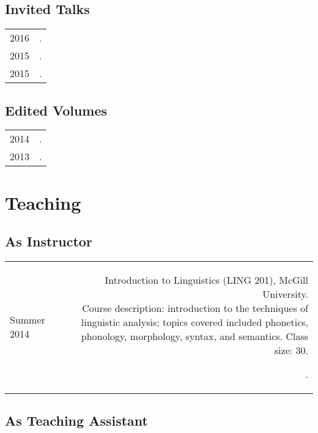 \documentclass[11pt,letterpaper,twoside]{article}
\makeatletter
\newcommand{\bodywidth}{0.75}
\newenvironment{cvsection}{%
  \renewcommand{\arraystretch}{1.75}
  \begin{longtable}[l]{@{} L R @{}}
}{%
  \end{longtable}
}
\newcommand{\course}[3]{%
  \parbox[t]{\bodywidth\textwidth}{#1.\\ {\footnotesize Course description: #2.
      Class size: #3.}}
}
\makeatother
\begin{document}
\subsection*{Invited Talks}

\begin{cvsection}
  2016 & .\\
  2015 & .\\
  2015 & .\\
\end{cvsection}

\subsection*{Edited Volumes}

\begin{cvsection}
  2014 & .\\
  2013 & .
\end{cvsection}

\section*{Teaching}

\subsection*{As Instructor}

\begin{cvsection}
  {\small Summer} 2014 & \course{Introduction to Linguistics (LING 201), McGill
    University}{introduction to the techniques of linguistic analysis; topics
    covered included phonetics, phonology, morphology, syntax, and
    semantics}{30}.
\end{cvsection}

\subsection*{As Teaching Assistant}
\end{document}
